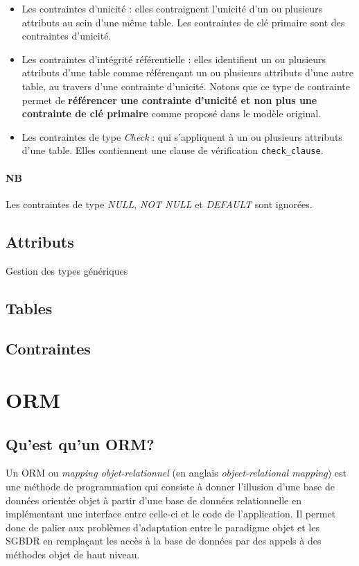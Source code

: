 \begin{itemize}
\item Les contraintes d'unicité : elles contraignent l'unicité d'un ou plusieurs attributs au sein d'une même table. Les contraintes de clé primaire sont des contraintes d'unicité.
\item Les contraintes d'intégrité référentielle : elles identifient un ou plusieurs attributs d'une table comme référençant un ou plusieurs attributs d'une autre table, au travers d'une contrainte d'unicité. Notons que ce type de contrainte permet de \textbf{référencer une contrainte d'unicité et non plus une contrainte de clé primaire} comme proposé dans le modèle original.
\item Les contraintes de type \emph{Check} : qui s'appliquent à un ou plusieurs attributs d'une table. Elles contiennent une clause de vérification \texttt{check\_clause}.
\end{itemize}

\paragraph*{NB}
Les contraintes de type \emph{NULL}, \emph{NOT NULL} et \emph{DEFAULT} sont ignorées.

	\subsection{Attributs}
		Gestion des types génériques
	\subsection{Tables}
	\subsection{Contraintes}
	
\section{ORM}

	\subsection{Qu'est qu'un ORM?}
    Un ORM ou \emph{mapping objet-relationnel} (en anglais \emph{object-relational mapping}) est une méthode de programmation qui consiste à donner l'illusion d'une base de données orientée objet à partir d'une base de données relationnelle en implémentant une interface entre celle-ci et le code de l'application. Il permet donc de palier aux problèmes d'adaptation entre le paradigme objet et les SGBDR en remplaçant les accès à la base de données par des appels à des méthodes objet de haut niveau.
   

